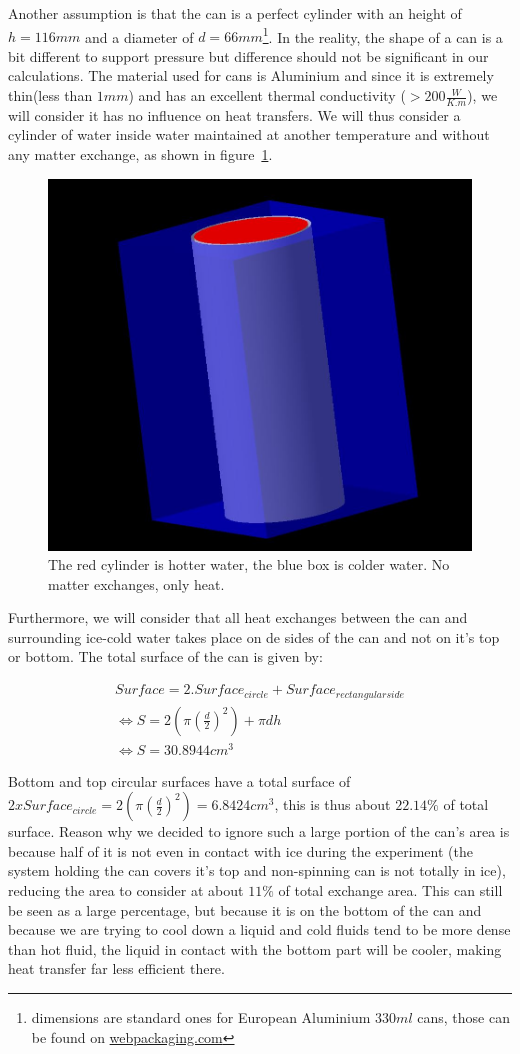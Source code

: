 \documentclass{report}
\begin{document}
	Another assumption is that the can is a perfect cylinder with an height of $h=116mm$ and a diameter of $d=66mm$\footnote{dimensions are standard ones for European Aluminium $330ml$ cans, those can be found on \hyperref{http://www.webpackaging.com/en/portals/rexam/assets/11059498/spec-alu-202/}{}{}{webpackaging.com}}. In the reality, the shape of a can is a bit different to support pressure but difference should not be significant in our calculations. The material used for cans is Aluminium and since it is extremely thin(less than $1mm$) and has an excellent thermal conductivity ($>200\frac{W}{K.m}$), we will consider it has no influence on heat transfers. We will thus consider a cylinder of water inside water maintained at another temperature and without any matter exchange, as shown in figure~\ref{cyl}.
	
	\begin{figure}
		\label{cyl}
		\centering
		\includegraphics[width=.5\textwidth]{img/cyl.jpg}
		\caption{The red cylinder is hotter water, the blue box is colder water. No matter exchanges, only heat.}
	\end{figure}
	
	Furthermore, we will consider that all heat exchanges between the can and surrounding ice-cold water takes place on de sides of the can and not on it's top or bottom. The total surface of the can is given by:
	
	\begin{equation}
	\begin{gathered}
		Surface= 2.Surface_{circle} + Surface_{rectangular side} \\
		\Leftrightarrow S= 2 (\pi  (\frac{d}{2})^2) + \pi dh \\
		\Leftrightarrow S= 30.8944 cm^3
	\end{gathered}
	\end{equation}
	
	Bottom and top circular surfaces have a total surface of $2xSurface_{circle}=2 (\pi  (\frac{d}{2})^2)= 6.8424 cm^3$, this is thus about $22.14\% $ of total surface. Reason why we decided to ignore such a large portion of the can's area is because half of it is not even in contact with ice during the experiment (the system holding the can covers it's top and non-spinning can is not totally in ice), reducing the area to consider at about $11\% $ of total exchange area. This can still be seen as a large percentage, but because it is on the bottom of the can and because we are trying to cool down a liquid and cold fluids tend to be more dense than hot fluid, the liquid in contact with the bottom part will be cooler, making heat transfer far less efficient there.
	
\end{document}
